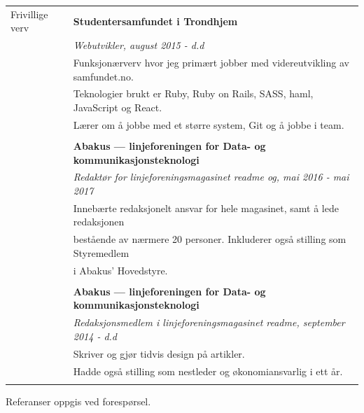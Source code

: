 \documentclass[letterpaper,10pt,oneside]{article}
\begin{document}
\begin{longtable}{@{} l l}
 \Large{Frivillige verv}    & \textbf{Studentersamfundet i Trondhjem} \\
 & \textit{Webutvikler, august 2015 - d.d}\\
     & Funksjonærverv hvor jeg primært jobber med videreutvikling av samfundet.no. \\
     & Teknologier brukt er Ruby, Ruby on Rails, SASS, haml, JavaScript og React. \\
     & Lærer om å jobbe med et større system, Git og å jobbe i team.\\
     & \\
     & \textbf{Abakus --- linjeforeningen for Data- og kommunikasjonsteknologi} \\
     & \textit{Redaktør for linjeforeningsmagasinet readme og, mai 2016 - mai 2017}\\
     & Innebærte redaksjonelt ansvar for hele magasinet, samt å lede redaksjonen \\
     & bestående av nærmere 20 personer. Inkluderer også stilling som Styremedlem \\
     & i Abakus' Hovedstyre. \\
     & \\
     & \textbf{Abakus --- linjeforeningen for Data- og kommunikasjonsteknologi} \\
     & \textit{Redaksjonsmedlem i linjeforeningsmagasinet readme, september 2014 - d.d}\\
     & Skriver og gjør tidvis design på artikler. \\
     & Hadde også stilling som nestleder og økonomiansvarlig i ett år.\\
     & \\

\end{longtable}

Referanser oppgis ved forespørsel.
\end{document}
